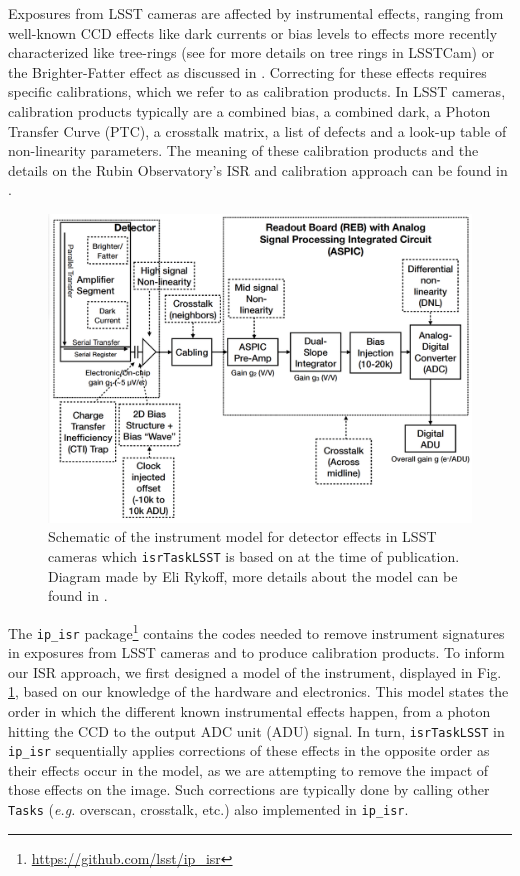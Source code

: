 Exposures from LSST cameras are affected by instrumental effects, ranging from well-known CCD effects like dark currents or bias levels to effects more recently characterized like tree-rings (see \cite{park_properties_2017,park_tree_2020,esteves_photometry_2023} for more details on tree rings in LSSTCam) or the Brighter-Fatter effect as discussed in \cite{broughton_2023}. Correcting for these effects requires specific calibrations, which we refer to as calibration products. In LSST cameras, calibration products typically are a combined bias, a combined dark, a Photon Transfer Curve (PTC), a crosstalk matrix, a list of defects and a look-up table of non-linearity parameters.
The meaning of these calibration products and the details on the Rubin Observatory's ISR and calibration approach can be found in \citep{SITCOMTN-086}.
\begin{figure}[h!]
    \centering
\includegraphics[scale=0.25]{isr_plots/instrumentmodel_isr.png}
    \caption{Schematic of the instrument model for detector effects in LSST cameras which \texttt{isrTaskLSST} is based on at the time of publication. Diagram made by Eli Rykoff, more details about the model can be found in \citet{SITCOMTN-086}.}
    \label{fig:isr_model}
\end{figure}

The \texttt{ip\_isr} package\footnote{\url{https://github.com/lsst/ip_isr}} contains the codes needed to remove instrument signatures in exposures from LSST cameras and to produce calibration products.
To inform our ISR approach, we first designed a model of the instrument, displayed in Fig. \ref{fig:isr_model}, based on our knowledge of the hardware and electronics.
This model states the order in which the different known instrumental effects happen, from a photon hitting the CCD to the output ADC unit (ADU) signal.
In turn, \texttt{isrTaskLSST} in \texttt{ip\_isr} sequentially applies corrections of these effects in the opposite order as their effects occur in the model, as we are attempting to remove the impact of those effects on the image. Such corrections are typically done by calling other \texttt{Tasks} (\textit{e.g.} overscan, crosstalk, etc.) also implemented in \texttt{ip\_isr}.


